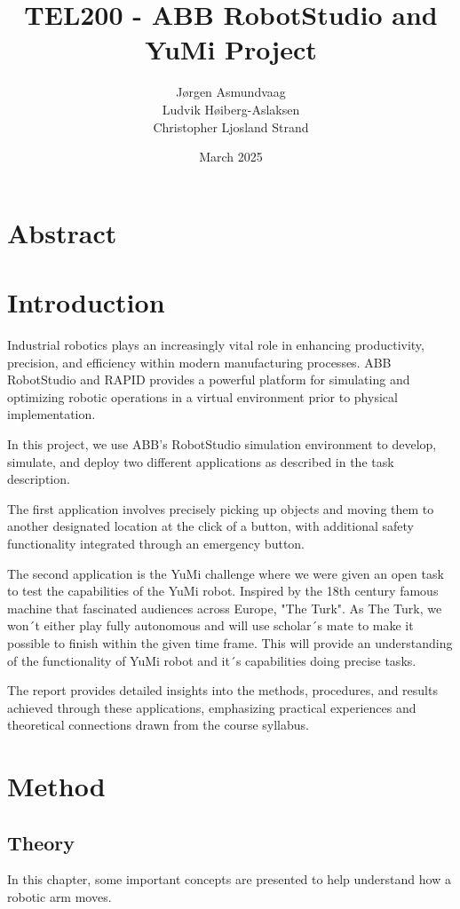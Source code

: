 \documentclass[a4paper,12pt]{article}
\title{TEL200 - ABB RobotStudio and YuMi Project}
\author{J\o rgen Asmundvaag \\ Ludvik H\o iberg-Aslaksen \\ Christopher Ljosland Strand}
\date{March 2025}
\begin{document}
\maketitle

\newpage
\section{Abstract}
\section{Introduction}
Industrial robotics plays an increasingly vital role in enhancing productivity, precision, and efficiency within modern manufacturing processes. ABB RobotStudio and RAPID provides a powerful platform for simulating and optimizing robotic operations in a virtual environment prior to physical implementation.

In this project, we use ABB's RobotStudio simulation environment to develop, simulate, and deploy two different applications as described in the task description. 

The first application involves precisely picking up objects and moving them to another designated location at the click of a button, with additional safety functionality integrated through an emergency button.

The second application is the YuMi challenge where we were given an open task to test the capabilities of the YuMi robot. Inspired by the 18th century famous machine that fascinated audiences across Europe, "The Turk". As The Turk, we won´t either play fully autonomous and will use scholar´s mate to make it possible to finish within the given time frame. This  will provide an understanding of the functionality of YuMi robot and it´s capabilities doing precise tasks.

The report provides detailed insights into the methods, procedures, and results achieved through these applications, emphasizing practical experiences and theoretical connections drawn from the course syllabus.

\section{Method}
\subsection{Theory}
In this chapter, some important concepts are presented to help understand how a robotic arm moves.
\end{document}
